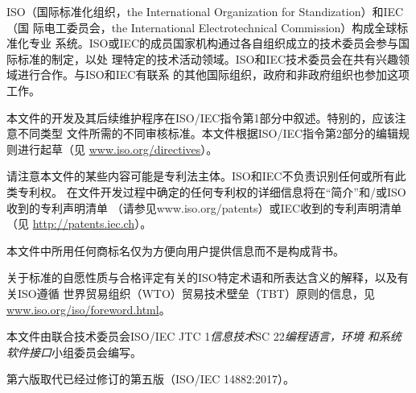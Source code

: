 ISO（国际标准化组织，the International Organization for Standization）和IEC（国
际电工委员会，the International Electrotechnical Commission）构成全球标准化专业
系统。ISO或IEC的成员国家机构通过各自组织成立的技术委员会参与国际标准的制定，以处
理特定的技术活动领域。ISO和IEC技术委员会在共有兴趣领域进行合作。与ISO和IEC有联系
的其他国际组织，政府和非政府组织也参加这项工作。

本文件的开发及其后续维护程序在ISO/IEC指令第1部分中叙述。特别的，应该注意不同类型
文件所需的不同审核标准。本文件根据ISO/IEC指令第2部分的编辑规则进行起草（见
\href{https://www.iso.org/directives}{www.iso.org/directives}）。

请注意本文件的某些内容可能是专利法主体。ISO和IEC不负责识别任何或所有此类专利权。
在文件开发过程中确定的任何专利权的详细信息将在“简介”和/或ISO收到的专利声明清单
（请参见www.iso.org/patents）或IEC收到的专利声明清单（见
\href{http://patents.iec.ch}{http://patents.iec.ch}）。

本文件中所用任何商标名仅为方便向用户提供信息而不是构成背书。

关于标准的自愿性质与合格评定有关的ISO特定术语和所表达含义的解释，以及有关ISO遵循
世界贸易组织（WTO）贸易技术壁垒（TBT）原则的信息，见
\href{www.iso.org/iso/foreword.html}{www.iso.org/iso/foreword.html}。

本文件由联合技术委员会ISO/IEC JTC 1\textit{信息技术}SC 22\textit{编程语言，环境
和系统软件接口}小组委员会编写。

第六版取代已经过修订的第五版（ISO/IEC 14882:2017）。

